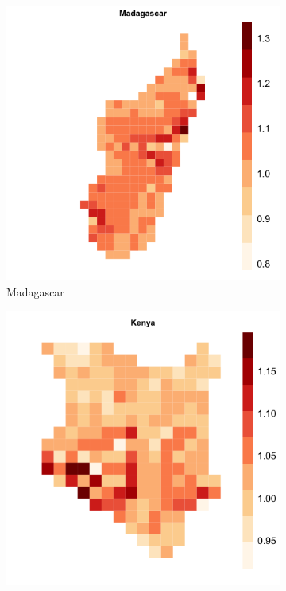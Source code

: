 \documentclass[11pt, oneside]{article}   	%
\begin{document}
\begin{figure}[!ph]
\begin{subfigure}[c]{0.32\textwidth}
\includegraphics[width=\textwidth]{../../Analysis/output/zeta_heatmaps/Madagascar_zeta.png}
\caption{Madagascar}
\label{fig:Madagascar_zeta}
\end{subfigure}
\begin{subfigure}[c]{0.32\textwidth}
\includegraphics[width=\textwidth]{../../Analysis/output/zeta_heatmaps/Kenya_zeta.png}

\end{subfigure}
\end{figure}
\end{document}
